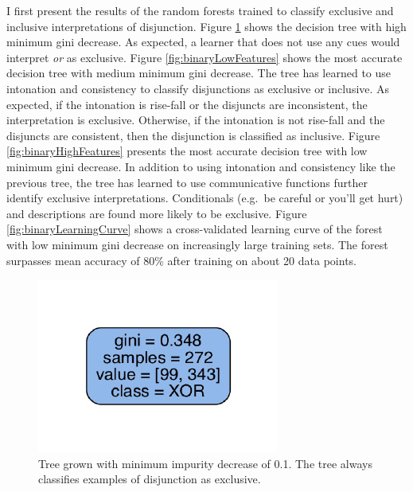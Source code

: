 \documentclass[oneside]{report}
\theoremstyle{definition}
\theoremstyle{definition}
\theoremstyle{definition}
\theoremstyle{remark}
\begin{document}
I first present the results of the random forests trained to classify
exclusive and inclusive interpretations of disjunction. Figure
\ref{fig:binaryNoFeatures} shows the decision tree with high minimum
gini decrease. As expected, a learner that does not use any cues would
interpret \emph{or} as exclusive. Figure \ref{fig:binaryLowFeatures}
shows the most accurate decision tree with medium minimum gini decrease.
The tree has learned to use intonation and consistency to classify
disjunctions as exclusive or inclusive. As expected, if the intonation
is rise-fall or the disjuncts are inconsistent, the interpretation is
exclusive. Otherwise, if the intonation is not rise-fall and the
disjuncts are consistent, then the disjunction is classified as
inclusive. Figure \ref{fig:binaryHighFeatures} presents the most
accurate decision tree with low minimum gini decrease. In addition to
using intonation and consistency like the previous tree, the tree has
learned to use communicative functions further identify exclusive
interpretations. Conditionals (e.g.~be careful or you'll get hurt) and
descriptions are found more likely to be exclusive. Figure
\ref{fig:binaryLearningCurve} shows a cross-validated learning curve of
the forest with low minimum gini decrease on increasingly large training
sets. The forest surpasses mean accuracy of 80\% after training on about
20 data points.
\begin{figure}
\centering
\includegraphics{figs/binaryNoFeatures-1.pdf}
\caption{\label{fig:binaryNoFeatures}Tree grown with minimum impurity
decrease of 0.1. The tree always classifies examples of disjunction as
exclusive.}
\end{figure}
\end{document}
